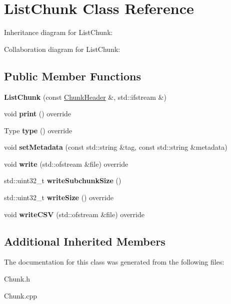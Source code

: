 \hypertarget{classListChunk}{}\section{List\+Chunk Class Reference}
\label{classListChunk}


Inheritance diagram for List\+Chunk\+:


Collaboration diagram for List\+Chunk\+:
\subsection*{Public Member Functions}
\begin{DoxyCompactItemize}
\item 
\mbox{\label{classListChunk_a1e807f257bde584c47a1faac0a97ff2d}} 
{\bfseries List\+Chunk} (const \hyperlink{structChunkHeader}{Chunk\+Header} \&, std\+::ifstream \&)
\item 
\mbox{\label{classListChunk_a379dd8508ae184a723dc3aae3b36cf5a}} 
void {\bfseries print} () override
\item 
\mbox{\label{classListChunk_a74523e65fee92ac71a9e6df58400c3dd}} 
Type {\bfseries type} () override
\item 
\mbox{\label{classListChunk_a441ed28697352b4e436eb2fa0111959b}} 
void {\bfseries set\+Metadata} (const std\+::string \&tag, const std\+::string \&metadata)
\item 
\mbox{\label{classListChunk_ae1d79e41f3afa099edb64960c22fd011}} 
void {\bfseries write} (std\+::ofstream \&file) override
\item 
\mbox{\label{classListChunk_a360c24e154f167fbd4941c8cf5b79730}} 
std\+::uint32\+\_\+t {\bfseries write\+Subchunk\+Size} ()
\item 
\mbox{\label{classListChunk_a3ef159e2afd60fd9b9ed668a1cc73ec5}} 
std\+::uint32\+\_\+t {\bfseries write\+Size} () override
\item 
\mbox{\label{classListChunk_af08185b8846d72b8b49b256080ce8075}} 
void {\bfseries write\+C\+SV} (std\+::ofstream \&file) override
\end{DoxyCompactItemize}
\subsection*{Additional Inherited Members}


The documentation for this class was generated from the following files\+:\begin{DoxyCompactItemize}
\item 
Chunk.\+h\item 
Chunk.\+cpp\end{DoxyCompactItemize}
